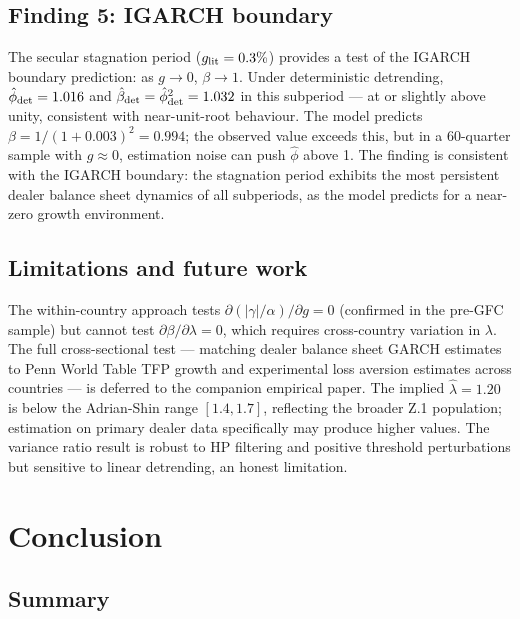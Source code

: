 \documentclass[12pt,a4paper]{article}
\theoremstyle{definition}
\begin{document}
\subsection{Finding 5: IGARCH boundary}
\label{sec:finding5}

The secular stagnation period ($g_{\rm lit} = 0.3\%$) provides a test
of the IGARCH boundary prediction: as $g \to 0$, $\beta \to 1$. Under
deterministic detrending, $\hat{\phi}_{\rm det} = 1.016$ and
$\hat{\beta}_{\rm det} = \hat{\phi}^2_{\rm det} = 1.032$ in this
subperiod --- at or slightly above unity, consistent with near-unit-root
behaviour. The model predicts $\beta = 1/(1+0.003)^2 = 0.994$;
the observed value exceeds this, but in a 60-quarter sample with
$g \approx 0$, estimation noise can push $\hat{\phi}$ above 1. The
finding is consistent with the IGARCH boundary: the stagnation period
exhibits the most persistent dealer balance sheet dynamics of all
subperiods, as the model predicts for a near-zero growth environment.

\subsection{Limitations and future work}
\label{sec:empirical_limits}

The within-country approach tests $\partial(|\gamma|/\alpha)/\partial
g = 0$ (confirmed in the pre-GFC sample) but cannot test
$\partial\beta/\partial\lambda = 0$, which requires cross-country
variation in $\lambda$. The full cross-sectional test --- matching
dealer balance sheet GARCH estimates to Penn World Table TFP growth and
\citet{wang2017} experimental loss aversion estimates across countries
--- is deferred to the companion empirical paper. The implied
$\hat{\lambda} = 1.20$ is below the Adrian-Shin range $[1.4, 1.7]$,
reflecting the broader Z.1 population; estimation on primary dealer
data specifically may produce higher values. The variance ratio result
is robust to HP filtering and positive threshold perturbations but
sensitive to linear detrending, an honest limitation.


\section{Conclusion}
\label{sec:conclusion}

\subsection{Summary}
\label{sec:summary}
\end{document}
